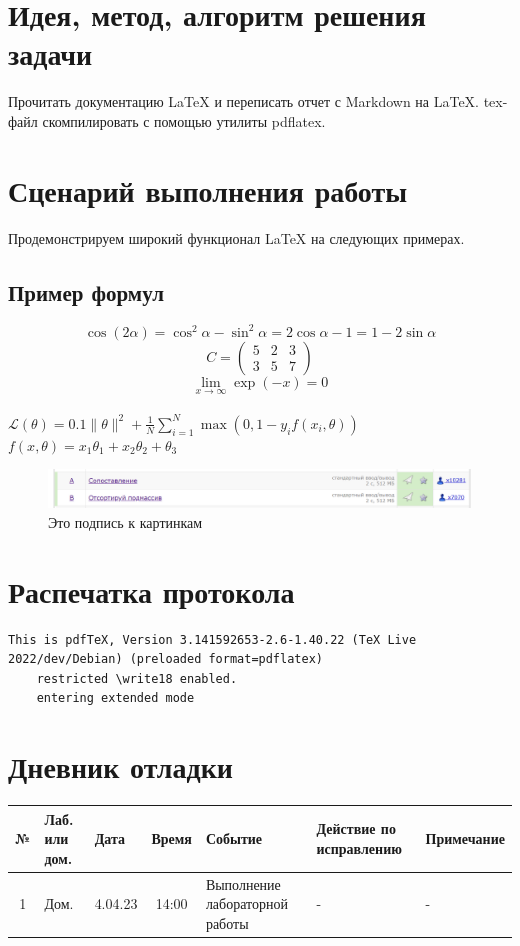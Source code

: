 \documentclass[12pt, letterpaper]{article}
\begin{document}
\section{Идея, метод, алгоритм решения задачи}
Прочитать документацию \LaTeX{} и переписать отчет с Markdown на \LaTeX{}. tex-файл скомпилировать с помощью утилиты pdflatex.
\section{Сценарий выполнения работы}
Продемонстрируем широкий функционал \LaTeX{} на следующих примерах.
\subsection{Пример формул}
\[\cos (2\alpha) = \cos^2 \alpha - \sin^2 \alpha = 2\cos\alpha - 1 = 1 - 2\sin\alpha\]
\[C=
\begin{pmatrix}
5 & 2 & 3\\
3 & 5 & 7
\end{pmatrix}\]
\[
\lim\limits_{x \to \infty} \exp(-x) = 0
\] \\
$\mathcal{L}(\theta) = 0.1 \|\theta\|^2 + \frac{1}{N}\sum\limits_{i=1}^N \max(0, 1 - y_i f(x_i, \theta))$ \\
$f(x, \theta) = x_1 \theta_1 + x_2 \theta_2 + \theta_3$ \\
\begin{figure}[h]
\centering
\includegraphics[width=0.9\linewidth]{pic1.png}
\caption{Это подпись к картинкам}
\label{fig:mpr}
\end{figure}
\section{Распечатка протокола}
\begin{lstlisting}[breaklines]
    This is pdfTeX, Version 3.141592653-2.6-1.40.22 (TeX Live 2022/dev/Debian) (preloaded format=pdflatex)
    restricted \write18 enabled.
    entering extended mode
\end{lstlisting}  
\section{Дневник отладки}
\begin{tabular}{|c|p{1cm}|p{1.5cm}|c|p{2.5cm}|p{2cm}|p{2.25cm}|}
    \hline
    № & Лаб. или дом. & Дата & Время & Событие & Действие по исправлению & Примечание\\
    \hline
    1 & Дом. & 4.04.23 & 14:00 & Выполнение лабораторной работы & - & -\\
    \hline
\end{tabular}
\end{document}
